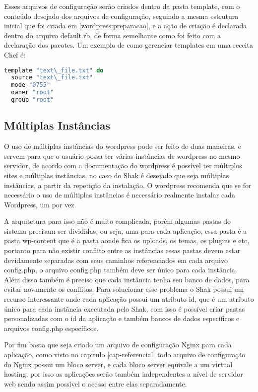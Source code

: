 Esses arquivos de configuração serão criados dentro da pasta template, com o conteúdo
desejado dos arquivos de configuração, seguindo a mesma estrutura
inicial que foi criada em \ref{wordpress:preparacao}, e a ação de criação é
declarada dentro do arquivo default.rb, de forma semelhante como foi feito com
a declaração dos pacotes. Um exemplo de como gerenciar templates em uma receita Chef
é:

\begin{lstlisting}[language=Ruby,label=dice_index,caption={Exemplo de criação de templates com o chef}]
  template "text\_file.txt" do
  source "text\_file.txt"
  mode "0755"
  owner "root"
  group "root"
\end{lstlisting}

\subsection{Múltiplas Instâncias}

O uso de múltiplas instâncias do wordpress pode ser feito de duas maneiras, e servem
para que o usuário possa ter várias instâncias de wordpress no mesmo servidor, de
acordo com a documentação do wordpress é possível ter múltiplos sites e múltiplas
instâncias, no caso do Shak é desejado que seja múltiplas instâncias, a partir da
repetição da instalação. O wordpress recomenda que se for necessário o uso de múltiplas
instâncias é necessário realmente instalar cada Wordpress, um por vez.

A arquitetura para isso não é muito complicada, porém algumas pastas do sistema
precisam ser divididas, ou seja, uma para cada aplicação, essa pasta é a pasta wp-content
que é a pasta aonde fica os uploads, os temas, os plugins e etc, portanto para não
existir conflito entre as instâncias essas pastas devem estar devidamente separadas
com seus caminhos referenciados em cada arquivo config.php, o arquivo config.php também
deve ser único para cada instância. Além disso também é preciso que cada instância
tenha seu banco de dados, para evitar novamente os conflitos. Para
solucionar esse problema o Shak possui um recurso interessante onde cada aplicação
possui um atributo id, que é um atributo único para cada instância executada pelo
Shak, com isso é possível criar pastas personalizadas com o id da aplicação e também
bancos de dados específicos e arquivos config.php específicos.

Por fim basta que seja criado um arquivo de configuração Nginx para cada aplicação,
como visto no capitulo \ref{cap-referencial} todo arquivo de configuração
do Nginx possui um bloco server, e cada bloco server equivale a um virtual hosting,
por isso as aplicações serão também independentes a nível de servidor web sendo assim
possível o acesso entre elas separadamente.

